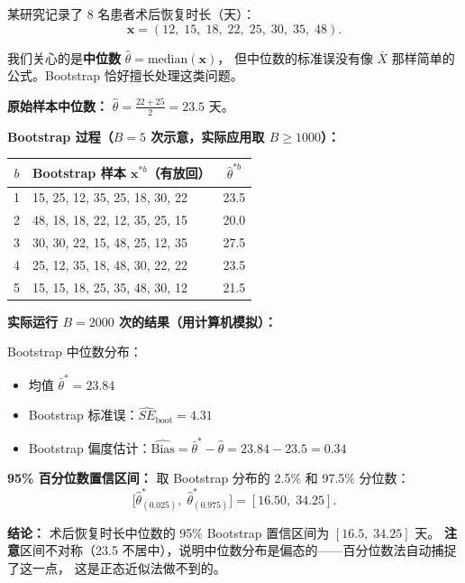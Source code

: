 \begin{example}
某研究记录了 8 名患者术后恢复时长（天）：
\begin{equation}
    \bm{x} = (12,\; 15,\; 18,\; 22,\; 25,\; 30,\; 35,\; 48).
\end{equation}

我们关心的是\textbf{中位数} $\hat{\theta} = \text{median}(\bm{x})$，
但中位数的标准误没有像 $\bar{X}$ 那样简单的公式。Bootstrap 恰好擅长处理这类问题。

\medskip
\textbf{原始样本中位数：}
$\hat{\theta} = \frac{22 + 25}{2} = 23.5$ 天。

\medskip
\textbf{Bootstrap 过程（$B = 5$ 次示意，实际应用取 $B \ge 1000$）：}

\begin{center}
\begin{tabular}{c|l|c}
    \toprule
    $b$ & Bootstrap 样本 $\bm{x}^{*b}$（有放回） & $\hat{\theta}^{*b}$ \\
    \midrule
    1 & 15, 25, 12, 35, 25, 18, 30, 22 & 23.5 \\
    2 & 48, 18, 18, 22, 12, 35, 25, 15 & 20.0 \\
    3 & 30, 30, 22, 15, 48, 25, 12, 35 & 27.5 \\
    4 & 25, 12, 35, 18, 48, 30, 22, 22 & 23.5 \\
    5 & 15, 15, 18, 25, 35, 48, 30, 12 & 21.5 \\
    \bottomrule
\end{tabular}
\end{center}

\medskip
\textbf{实际运行 $B = 2000$ 次的结果（用计算机模拟）：}

Bootstrap 中位数分布：
\begin{itemize}
    \item 均值 $\bar{\theta}^{*} = 23.84$
    \item Bootstrap 标准误：$\widehat{SE}_{\text{boot}} = 4.31$
    \item Bootstrap 偏度估计：$\widehat{\mathrm{Bias}} = \bar{\theta}^{*} - \hat{\theta} = 23.84 - 23.5 = 0.34$
\end{itemize}

\textbf{95\% 百分位数置信区间：}
取 Bootstrap 分布的 2.5\% 和 97.5\% 分位数：
\begin{equation}
    \bigl[\hat{\theta}^{*}_{(0.025)},\; \hat{\theta}^{*}_{(0.975)}\bigr]
    = [16.50,\; 34.25].
\end{equation}

\textbf{结论：} 术后恢复时长中位数的 95\% Bootstrap 置信区间为 $[16.5,\; 34.25]$ 天。
\textbf{注意}区间不对称（23.5 不居中），说明中位数分布是偏态的——百分位数法自动捕捉了这一点，
这是正态近似法做不到的。
\end{example}

